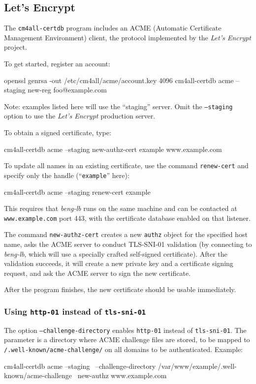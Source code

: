 \documentclass[a4paper,12pt]{article}
\begin{document}
\subsection{Let's Encrypt}

The \texttt{cm4all-certdb} program includes an ACME (Automatic
Certificate Management Environment) client, the protocol implemented
by the \emph{Let's Encrypt} project.

To get started, register an account:

\begin{verbatim*}
openssl genrsa -out /etc/cm4all/acme/account.key  4096
cm4all-certdb acme --staging new-reg foo@example.com
\end{verbatim*}

\small{Note: examples listed here will use the ``staging'' server.
  Omit the \texttt{--staging} option to use the \emph{Let's Encrypt}
  production server.}

To obtain a signed certificate, type:

\begin{verbatim*}
cm4all-certdb acme --staging new-authz-cert example www.example.com
\end{verbatim*}

To update all names in an existing certificate, use the command
\texttt{renew-cert} and specify only the handle (``\texttt{example}''
here):

\begin{verbatim*}
cm4all-certdb acme --staging renew-cert example
\end{verbatim*}

This requires that \emph{beng-lb} runs on the same machine and can be
contacted at \texttt{www.example.com} port 443, with the certificate
database enabled on that listener.

The command \texttt{new-authz-cert} creates a new \texttt{authz}
object for the specified host name, asks the ACME server to conduct
TLS-SNI-01 validation (by connecting to \emph{beng-lb}, which will use
a specially crafted self-signed certificate).  After the validation
succeeds, it will create a new private key and a certificate signing
request, and ask the ACME server to sign the new certificate.

After the program finishes, the new certificate should be usable
immediately.

\subsubsection{Using \texttt{http-01} instead of \texttt{tls-sni-01}}

The option \texttt{--challenge-directory} enables \texttt{http-01}
instead of \texttt{tls-sni-01}.  The parameter is a directory where
ACME challenge files are stored, to be mapped to
\texttt{/.well-known/acme-challenge/} on all domains to be
authenticated.  Example:

\begin{verbatim*}
cm4all-certdb acme --staging \
  --challenge-directory /var/www/example/.well-known/acme-challenge \
  new-authz www.example.com
\end{verbatim*}
\end{document}
